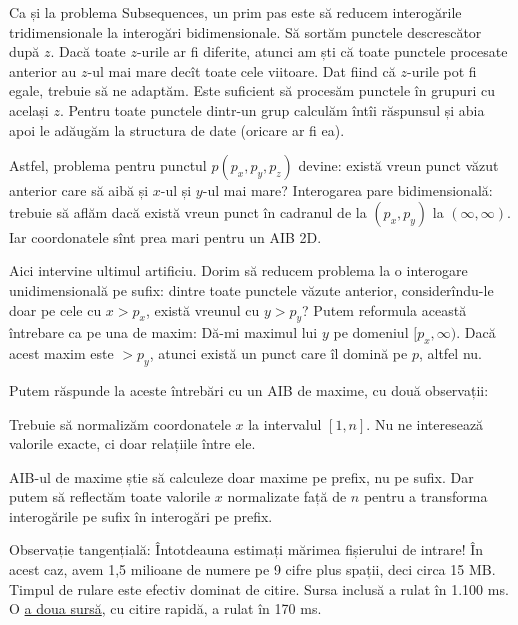 Ca și la problema Subsequences, un prim pas este să reducem interogările tridimensionale la interogări  bidimensionale. Să sortăm punctele descrescător după $z$. Dacă toate $z$-urile ar fi diferite, atunci am ști că toate punctele procesate anterior au $z$-ul mai mare decît toate cele viitoare. Dat fiind că $z$-urile pot fi egale, trebuie să ne adaptăm. Este suficient să procesăm  punctele în grupuri cu același $z$. Pentru toate punctele dintr-un grup calculăm întîi răspunsul și abia apoi le adăugăm la structura de date (oricare ar fi ea).

Astfel, problema pentru punctul $p(p_x, p_y, p_z)$ devine: există vreun punct văzut anterior care să aibă și $x$-ul și $y$-ul mai mare? Interogarea pare bidimensională: trebuie să aflăm dacă există vreun punct în cadranul de la $(p_x,p_y)$ la $(\infty,\infty)$. Iar coordonatele sînt prea mari pentru un AIB 2D.

Aici intervine ultimul artificiu. Dorim să reducem problema la o interogare unidimensională pe sufix: dintre toate punctele văzute anterior, considerîndu-le doar pe cele cu $x > p_x$, există vreunul cu $y > p_y$? Putem reformula această întrebare ca pe una de maxim: Dă-mi maximul lui $y$ pe domeniul $[p_x, \infty)$. Dacă acest maxim este  $> p_y$, atunci există un punct care îl domină pe $p$, altfel nu.

Putem răspunde la aceste întrebări cu un AIB de maxime, cu două observații:

Trebuie să normalizăm coordonatele $x$ la intervalul $[1, n]$. Nu ne interesează valorile exacte, ci doar relațiile între ele.

AIB-ul de maxime știe să calculeze doar maxime pe prefix, nu pe sufix. Dar putem să reflectăm toate valorile $x$ normalizate față de $n$ pentru a transforma interogările pe sufix în interogări pe prefix.

Observație tangențială: Întotdeauna estimați mărimea fișierului de intrare! În acest caz, avem 1,5 milioane de numere pe 9 cifre plus spații, deci circa 15 MB. Timpul de rulare este efectiv dominat de citire. Sursa inclusă a rulat în 1.100 ms. O \href{https://codeforces.com/contest/12/submission/280421220}{a doua sursă}, cu citire rapidă, a rulat în 170 ms.
